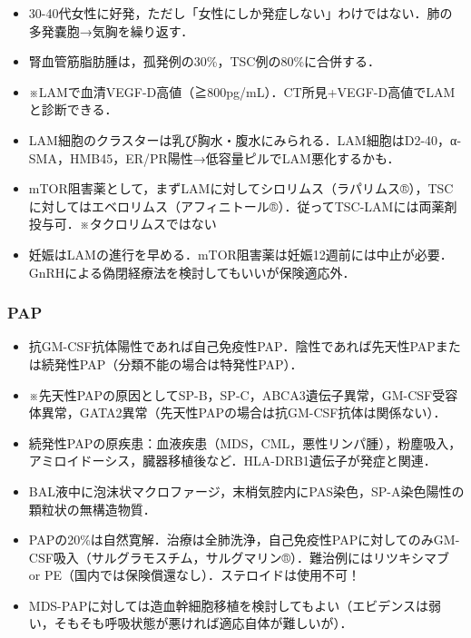 \begin{itemize}
\item 30-40代女性に好発，ただし「女性にしか発症しない」わけではない．肺の多発嚢胞→気胸を繰り返す．
\item 腎血管筋脂肪腫は，孤発例の30\%，TSC例の80\%に合併する．
\item ※LAMで血清VEGF-D高値（≧800pg/mL）．CT所見+VEGF-D高値でLAMと診断できる．
\item LAM細胞のクラスターは乳び胸水・腹水にみられる．LAM細胞はD2-40，α-SMA，HMB45，ER/PR陽性→低容量ピルでLAM悪化するかも．
\item mTOR阻害薬として，まずLAMに対してシロリムス（ラパリムス®），TSCに対してはエベロリムス（アフィニトール®）．従ってTSC-LAMには両薬剤投与可．※タクロリムスではない
\item 妊娠はLAMの進行を早める．mTOR阻害薬は妊娠12週前には中止が必要．GnRHによる偽閉経療法を検討してもいいが保険適応外．
\end{itemize}


\subsubsection{PAP}

\begin{itemize}
\item 抗GM-CSF抗体陽性であれば自己免疫性PAP．陰性であれば先天性PAPまたは続発性PAP（分類不能の場合は特発性PAP）．
\item ※先天性PAPの原因としてSP-B，SP-C，ABCA3遺伝子異常，GM-CSF受容体異常，GATA2異常（先天性PAPの場合は抗GM-CSF抗体は関係ない）．
\item 続発性PAPの原疾患：血液疾患（MDS，CML，悪性リンパ腫），粉塵吸入，アミロイドーシス，臓器移植後など．HLA-DRB1遺伝子が発症と関連．
\item BAL液中に泡沫状マクロファージ，末梢気腔内にPAS染色，SP-A染色陽性の顆粒状の無構造物質．
\item PAPの20\%は自然寛解．治療は全肺洗浄，自己免疫性PAPに対してのみGM-CSF吸入（サルグラモスチム，サルグマリン®）．難治例にはリツキシマブ or PE（国内では保険償還なし）．ステロイドは使用不可！
\item MDS-PAPに対しては造血幹細胞移植を検討してもよい（エビデンスは弱い，そもそも呼吸状態が悪ければ適応自体が難しいが）．
\end{itemize}



